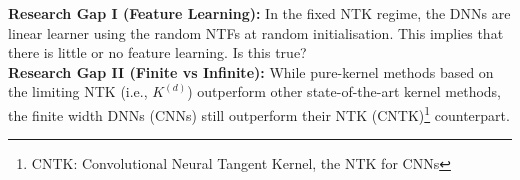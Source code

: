 \textbf{Research Gap I (Feature Learning):} In the fixed NTK regime, the DNNs are linear learner using the random NTFs at random initialisation. This implies that there is little or no feature learning. Is this true?\\
\textbf{Research Gap II (Finite vs Infinite):} While pure-kernel methods based on the limiting NTK (i.e., $K^{(d)}$) outperform other state-of-the-art kernel methods, the finite width DNNs (CNNs) still outperform their NTK (CNTK)\footnote{CNTK: Convolutional Neural Tangent Kernel, the NTK for CNNs} counterpart.

